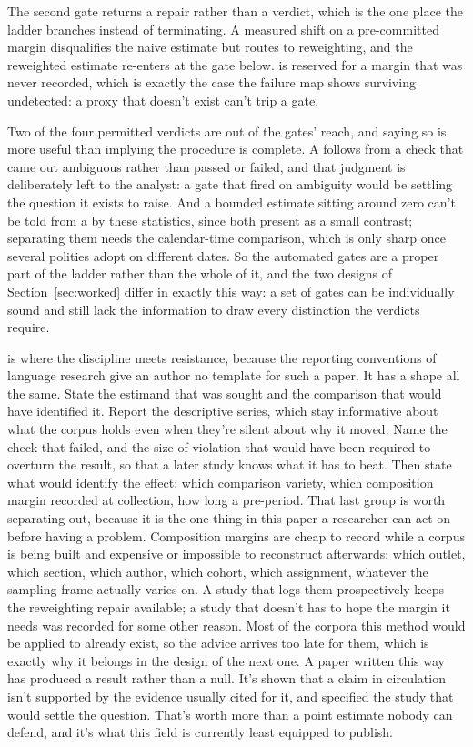The second gate returns a repair rather than a verdict, which is the one place the ladder branches instead of terminating. A measured shift on a pre-committed margin disqualifies the naive estimate but routes to reweighting, and the reweighted estimate re-enters at the gate below.  is reserved for a margin that was never recorded, which is exactly the case the failure map shows surviving undetected: a proxy that doesn't exist can't trip a gate.

Two of the four permitted verdicts are out of the gates' reach, and saying so is more useful than implying the procedure is complete. A  follows from a check that came out ambiguous rather than passed or failed, and that judgment is deliberately left to the analyst: a gate that fired on ambiguity would be settling the question it exists to raise. And a bounded estimate sitting around zero can't be told from a  by these statistics, since both present as a small contrast; separating them needs the calendar-time comparison, which is only sharp once several polities adopt on different dates. So the automated gates are a proper part of the ladder rather than the whole of it, and the two designs of Section~\ref{sec:worked} differ in exactly this way: a set of gates can be individually sound and still lack the information to draw every distinction the verdicts require.

 is where the discipline meets resistance, because the reporting conventions of language research give an author no template for such a paper. It has a shape all the same. State the estimand that was sought and the comparison that would have identified it. Report the descriptive series, which stay informative about what the corpus holds even when they're silent about why it moved. Name the check that failed, and the size of violation that would have been required to overturn the result, so that a later study knows what it has to beat. Then state what would identify the effect: which comparison variety, which composition margin recorded at collection, how long a pre-period. That last group is worth separating out, because it is the one thing in this paper a researcher can act on before having a problem. Composition margins are cheap to record while a corpus is being built and expensive or impossible to reconstruct afterwards: which outlet, which section, which author, which cohort, which assignment, whatever the sampling frame actually varies on. A study that logs them prospectively keeps the reweighting repair available; a study that doesn't has to hope the margin it needs was recorded for some other reason. Most of the corpora this method would be applied to already exist, so the advice arrives too late for them, which is exactly why it belongs in the design of the next one. A paper written this way has produced a result rather than a null. It's shown that a claim in circulation isn't supported by the evidence usually cited for it, and specified the study that would settle the question. That's worth more than a point estimate nobody can defend, and it's what this field is currently least equipped to publish.
